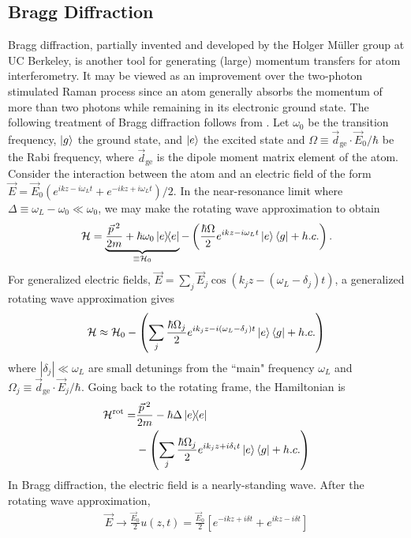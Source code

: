 \documentclass[reprint,
nofootinbib,
amsmath,amssymb,
aps]{revtex4-1}
\newcommand{\f}[2]{\frac{#1}{#2}}
\newcommand{\lp}{\left(}
\newcommand{\rp}{\right)}
\newcommand{\lb}{\left[}
\newcommand{\rb}{\right]}
\begin{document}
\subsection{Bragg Diffraction}\label{sect:BD}


Bragg diffraction, partially invented and developed by the Holger M\"{u}ller group at UC Berkeley, is another tool for generating (large) momentum transfers for atom interferometry. It may be viewed as an improvement over the two-photon stimulated Raman process since an atom generally absorbs the momentum of more than two photons while remaining in its electronic ground state.  The following treatment of Bragg diffraction follows from \cite{estey2016precision}. Let $\omega_0$ be the transition frequency, $\ket{g}$  the ground state, and $\ket{e}$  the excited state and $\Omega \equiv \vec{d}_\text{ge}\cdot \vec{E}_0/\hbar$ be the Rabi frequency, where $\vec{d}_\text{ge}$ is the dipole moment matrix element of the atom. Consider the interaction between the atom and an electric field of the form $\vec{E} = \vec{E}_0(e^{ikz - i \omega_Lt} + e^{-ikz+i\omega_Lt}) /2 $.  In the near-resonance limit where $\Delta \equiv \omega_L - \omega_0 \ll \omega_0$, we may make the rotating wave approximation to obtain 
\begin{align*}
\mathcal{H} = \underbrace{\f{\vec{p}\,^2}{2m} + \hbar \omega_0 \ketbra{e}}_{\equiv\mathcal{H}_0} - \lp \f{\hbar\Omega}{2}e^{ikz - i\omega_Lt} \ket{e}\bra{g} + h.c.\rp.
\end{align*}
For generalized electric fields, $\vec{E} = \sum_j \vec{E}_j \cos(k_j z - (\omega_L - \delta_j)t)$, a generalized rotating wave approximation gives
\begin{align*}
\mathcal{H} \approx \mathcal{H}_0 -  \lp \sum_j \f{\hbar\Omega_j}{2} e^{ik_j z - i(\omega_L - \delta_j) t} \ket{e}\bra{g} + h.c. \rp
\end{align*}
where $|\delta_j|\ll \omega_L$ are small detunings from the ``main" frequency $\omega_L$ and $\Omega_j \equiv \vec{d}_\text{ge}\cdot \vec{E}_j / \hbar$. Going back to the rotating frame, the Hamiltonian is 
\begin{align*}
\mathcal{H}^\text{rot} = &\f{\vec{p}\,^2}{2m} - \hbar \Delta \ketbra{e} \\
&- \lp \sum_j \f{\hbar \Omega_j}{2} e^{ik_jz + i \delta_i t} \ket{e}\bra{g} + h.c. \rp
\end{align*}
In Bragg diffraction, the electric field is a nearly-standing wave. After the rotating wave approximation, 
\begin{align}\label{eq:u}
\vec{E} \to \f{\vec{E}_0}{2}u(z,t) = \f{\vec{E}_0}{2} \lb  e^{-ikz + i\delta t} + e^{ikz-i\delta t}\rb
\end{align}
\end{document}
